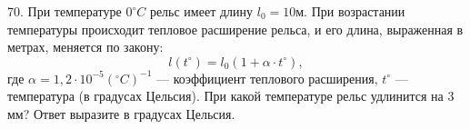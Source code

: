 70. При температуре $0^\circ C$ рельс имеет длину $l_0=10$м. При возрастании температуры происходит тепловое расширение рельса, и его длина, выраженная в метрах, меняется по закону:
$$l(t^\circ)=l_0(1+\alpha\cdot t^\circ),$$
где $\alpha=1,2\cdot10^{-5}(^\circ C)^{-1}$ --- коэффициент теплового расширения, $t^\circ$ --- температура (в градусах Цельсия). При какой температуре рельс удлинится на 3 мм? Ответ выразите в градусах Цельсия.\\
